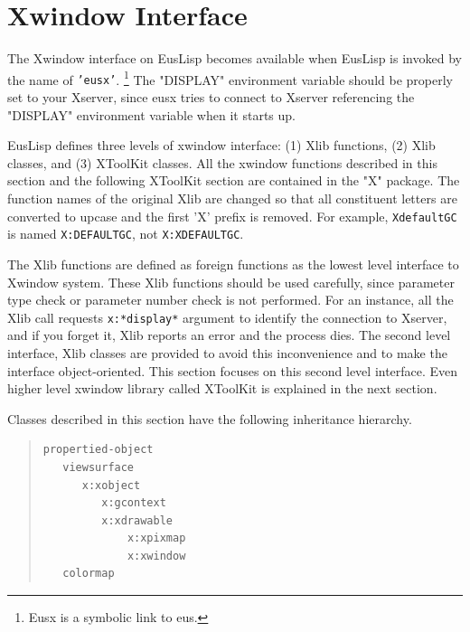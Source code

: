 \section{Xwindow Interface}
The Xwindow interface on EusLisp becomes available when EusLisp is
invoked by the name of {\tt 'eusx'}.
\footnote{Eusx is a symbolic link to eus.}
The "DISPLAY" environment variable should be properly set to your Xserver,
since eusx tries to connect to Xserver referencing
the "DISPLAY" environment variable when it starts up.

EusLisp defines three levels of xwindow interface:
(1) Xlib functions, (2) Xlib classes, and (3) XToolKit classes.
All the xwindow functions described in this section and the following
XToolKit section are contained in the "X" package.
The function names of the original Xlib are changed so that
all constituent letters are converted to upcase
and the first 'X' prefix is removed.
For example, {\tt XdefaultGC} is named {\tt X:DEFAULTGC},
not {\tt X:XDEFAULTGC}.

The Xlib functions are defined as foreign functions
as the lowest level interface to Xwindow system.
These Xlib functions should be used carefully, 
since parameter type check or parameter number check is not performed.
For an instance, all the Xlib call requests {\tt x:*display*} argument
to identify the connection to Xserver, and if you forget it, Xlib reports
an error and the process dies.
The second level interface, Xlib classes are provided
to avoid this inconvenience and to make the interface object-oriented.
This section focuses on this second level interface.
Even higher level xwindow library called XToolKit is explained 
in the next section.

Classes described in this section have the following inheritance
hierarchy.

\begin{quote}
\begin{verbatim}
propertied-object
   viewsurface
      x:xobject
         x:gcontext
         x:xdrawable
             x:xpixmap
             x:xwindow
   colormap
\end{verbatim}
\end{quote}

